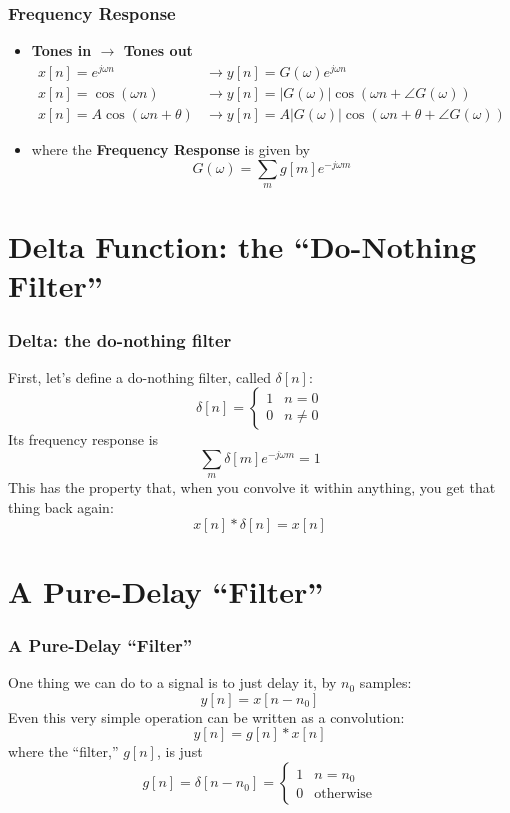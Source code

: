 \documentclass{beamer}
\begin{document}
\begin{frame}
  \frametitle{Frequency Response}
  \begin{itemize}
  \item {\bf Tones in $\rightarrow$ Tones out}
    \begin{align*}
      x[n]=e^{j\omega n} &\rightarrow y[n]=G(\omega)e^{j\omega n}\\
      x[n]=\cos\left(\omega n\right)
      &\rightarrow y[n]=|G(\omega)|\cos\left(\omega n+\angle G(\omega)\right)\\
      x[n]=A\cos\left(\omega n+\theta\right)
      &\rightarrow y[n]=A|G(\omega)|\cos\left(\omega n+\theta+\angle G(\omega)\right)
    \end{align*}
  \item where the {\bf Frequency Response} is given by
    \[
    G(\omega) = \sum_m g[m]e^{-j\omega m}
    \]
  \end{itemize}
\end{frame}  

\section[Delta]{Delta Function: the  ``Do-Nothing Filter''}
\setcounter{subsection}{1}

\begin{frame}
  \frametitle{Delta: the do-nothing filter}

  First, let's define a do-nothing filter, called $\delta[n]$:
  \[
  \delta[n] = \begin{cases}
    1 & n=0\\
    0 & n\ne 0
  \end{cases}
  \]
  Its frequency response is
  \[
  \sum_m \delta[m]e^{-j\omega m} = 1
  \]
  This has the property that, when you convolve it within anything, you get that thing back again:
  \[
  x[n]\ast \delta[n] = x[n]
  \]
\end{frame}

\section[Pure Delay]{A Pure-Delay ``Filter''}
\setcounter{subsection}{1}

\begin{frame}
  \frametitle{A Pure-Delay ``Filter''}

  One thing we can do to a signal is to just delay it, by $n_0$ samples:
  \[
  y[n] = x[n-n_0]
  \]
  Even this very simple operation can be written as a convolution:
  \[
  y[n]=g[n]\ast x[n]
  \]
  where the ``filter,'' $g[n]$, is just
  \[
  g[n]=\delta[n-n_0] = \begin{cases}
  1 & n=n_0\\
  0 & \mbox{otherwise}
  \end{cases}
  \]
\end{frame}
\end{document}
